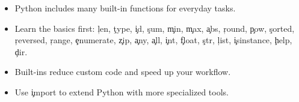 \begin{tcolorbox}[%
    colframe=orange,
    colback = white,
    arc=2mm %
 ]
\begin{itemize}
    \item Python includes many built-in functions for everyday tasks.
    \item Learn the basics first: \c{len}, \c{type}, \c{id}, \c{sum}, \c{min}, \c{max}, 
          \c{abs}, \c{round}, \c{pow}, \c{sorted}, \c{reversed}, \c{range}, 
          \c{enumerate}, \c{zip}, \c{any}, \c{all}, 
          \c{int}, \c{float}, \c{str}, \c{list}, \c{isinstance}, 
          \c{help}, \c{dir}.
    \item Built-ins reduce custom code and speed up your workflow.
    \item Use \c{import} to extend Python with more specialized tools.
\end{itemize}
\end{tcolorbox}

